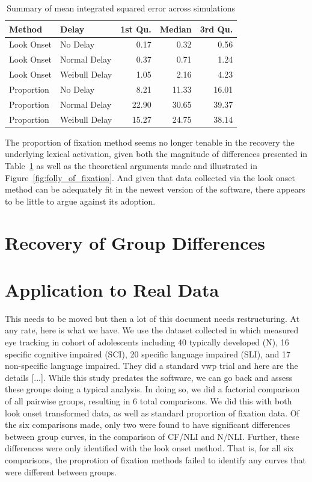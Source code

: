 \begin{table}[H]
\centering
\begin{tabular}{llrrr}
  \hline
Method & Delay & 1st Qu. & Median & 3rd Qu. \\ 
  \hline
Look Onset & No Delay & 0.17 & 0.32 & 0.56 \\ 
  Look Onset & Normal Delay & 0.37 & 0.71 & 1.24 \\ 
  Look Onset & Weibull Delay & 1.05 & 2.16 & 4.23 \\ 
  Proportion & No Delay & 8.21 & 11.33 & 16.01 \\ 
  Proportion & Normal Delay & 22.90 & 30.65 & 39.37 \\ 
  Proportion & Weibull Delay & 15.27 & 24.75 & 38.14 \\ 
   \hline
\end{tabular}
\caption{Summary of mean integrated squared error across simulations}
\label{tab:mise_sims}
\end{table}

The proportion of fixation method seems no longer tenable in the recovery the underlying lexical activation, given both the magnitude of differences presented in Table~\ref{tab:mise_sims} as well as the theoretical arguments made and illustrated in Figure~\ref{fig:folly_of_fixation}. And given that data collected via the look onset method can be adequately fit in the newest version of the  software, there appears to be little to argue against its adoption.


\section{Recovery of Group Differences}


\section{Application to Real Data}


This needs to be moved but then a lot of this document needs restructuring. At any rate, here is what we have. We use the dataset collected in \cite{mcmurray2010individual} which measured eye tracking in cohort of adolescents including 40 typically developed (N), 16 specific cognitive impaired (SCI), 20 specific language impaired (SLI), and 17 non-specific language impaired. They did a standard vwp trial and here are the details [...]. While this study predates the  software,  we can go back and assess these groups doing a typical analysis.  In doing so, we did a factorial comparison of all pairwise groups, resulting in 6 total comparisons. We did this with both look onset transformed data, as well as standard proportion of fixation data. Of the six comparisons made, only two were found to have significant differences between group curves, in the comparison of CF/NLI and N/NLI. Further, these differences were only identified with the look onset method. That is, for all six comparisons, the proprotion of fixation methods failed to identify any curves that were different between groups.

